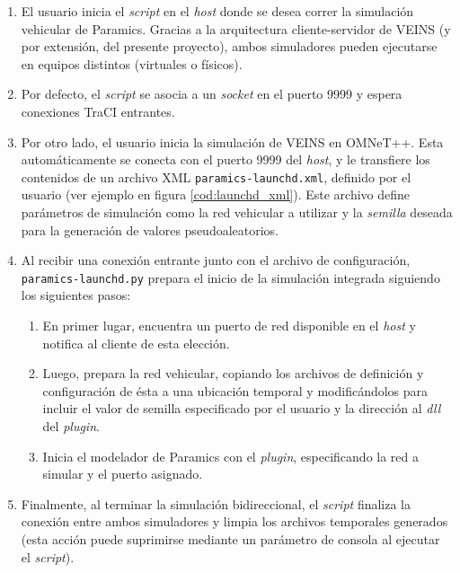 \begin{enumerate}
    \item El usuario inicia el \emph{script} en el \emph{host} donde se desea correr la simulación vehicular de Paramics. Gracias a la arquitectura cliente-servidor de VEINS (y por extensión, del presente proyecto), ambos simuladores pueden ejecutarse en equipos distintos (virtuales o físicos).
    
    \item Por defecto, el \emph{script} se asocia a un \emph{socket} en el puerto 9999 y espera conexiones TraCI entrantes.
    
    \item Por otro lado, el usuario inicia la simulación de VEINS en OMNeT++. Esta automáticamente se conecta con el puerto 9999 del \emph{host}, y le transfiere los contenidos de un archivo XML \texttt{paramics-launchd.xml}, definido por el usuario (ver ejemplo en figura \ref{cod:launchd_xml}). Este archivo define parámetros de simulación como la red vehicular a utilizar y la \emph{semilla} deseada para la generación de valores pseudoaleatorios.
    
    \item Al recibir una conexión entrante junto con el archivo de configuración, \texttt{paramics-launchd.py} prepara el inicio de la simulación integrada siguiendo los siguientes pasos:
    
    \begin{enumerate}
        \item En primer lugar, encuentra un puerto de red disponible en el \emph{host} y notifica al cliente de esta elección.
        \item Luego, prepara la red vehicular, copiando los archivos de definición y configuración de ésta a una ubicación temporal y modificándolos para incluir el valor de semilla especificado por el usuario y la dirección al \emph{dll} del \emph{plugin}.
        \item Inicia el modelador de Paramics con el \emph{plugin}, especificando la red a simular y el puerto asignado.
    \end{enumerate}

    \item Finalmente, al terminar la simulación bidireccional, el \emph{script} finaliza la conexión entre ambos simuladores y limpia los archivos temporales generados (esta acción puede suprimirse mediante un parámetro de consola al ejecutar el \emph{script}).
    
\end{enumerate}

\begin{figure}[tpb]
    
\end{figure}
